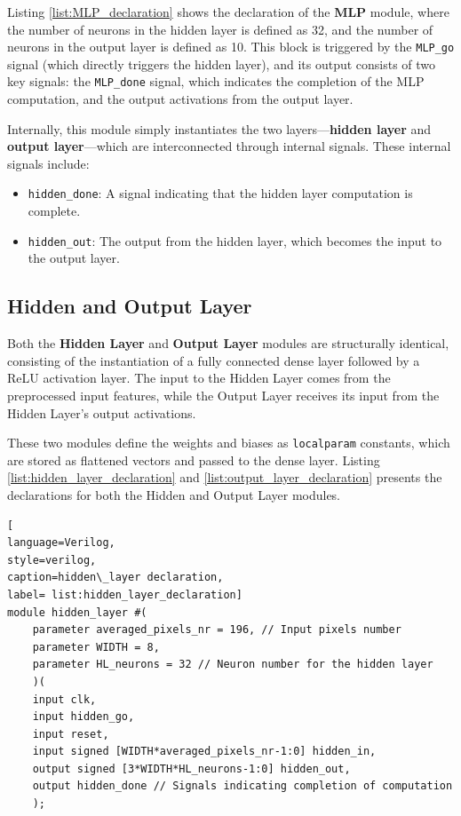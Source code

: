 \documentclass[11pt]{report}
\begin{document}
Listing \ref{list:MLP_declaration} shows the declaration of the \textbf{MLP} module, where the number of neurons in the hidden layer is defined as 32, and the number of neurons in the output layer is defined as 10. This block is triggered by the \texttt{MLP\_go} signal (which directly triggers the hidden layer), and its output consists of two key signals: the \texttt{MLP\_done} signal, which indicates the completion of the MLP computation, and the output activations from the output layer.

Internally, this module simply instantiates the two layers—\textbf{hidden layer} and \textbf{output layer}—which are interconnected through internal signals. These internal signals include:

\begin{itemize}
    \item \texttt{hidden\_done}: A signal indicating that the hidden layer computation is complete.
    \item \texttt{hidden\_out}: The output from the hidden layer, which becomes the input to the output layer.
\end{itemize}

\subsection{Hidden and Output Layer}

Both the \textbf{Hidden Layer} and \textbf{Output Layer} modules are structurally identical, consisting of the instantiation of a fully connected dense layer followed by a ReLU activation layer. The input to the Hidden Layer comes from the preprocessed input features, while the Output Layer receives its input from the Hidden Layer's output activations.

These two modules define the weights and biases as \texttt{localparam} constants, which are stored as flattened vectors and passed to the dense layer. Listing \ref{list:hidden_layer_declaration} and \ref{list:output_layer_declaration} presents the declarations for both the Hidden and Output Layer modules. 

\begin{lstlisting}[
language=Verilog,
style=verilog,
caption=hidden\_layer declaration,
label= list:hidden_layer_declaration]
module hidden_layer #(
    parameter averaged_pixels_nr = 196, // Input pixels number
    parameter WIDTH = 8,
    parameter HL_neurons = 32 // Neuron number for the hidden layer
	)(
    input clk,
    input hidden_go,
    input reset,
    input signed [WIDTH*averaged_pixels_nr-1:0] hidden_in,
    output signed [3*WIDTH*HL_neurons-1:0] hidden_out,
    output hidden_done // Signals indicating completion of computation
    );
\end{lstlisting}
\end{document}
